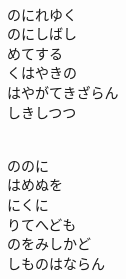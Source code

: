\documentclass[10pt,b5j]{tarticle} %
\begin{document}
\vspace{1.5em} %
\newcommand{\linespace}{0.5em} %
\newcommand{\blocksize}{0.5\hsize} %
\newcommand{\itemmargin}{3em} %
\begin{enumerate} %
    \setlength{\itemindent}{\itemmargin} %
    \begin{minipage}[c]{\blocksize}
    
        \vspace{\linespace}
        \item~\\
        のにれゆく\\
        のにしばし\\
        めてする\\
        くはやきの\\
        はやがてきざらん\\
        しきしつつ
        
    \end{minipage}
    \begin{minipage}[c]{\blocksize}
        
        \vspace{\linespace}
        \item~\\
        ののに\\
        はめぬを\\
        にくに\\
        りてへども\\
        のをみしかど\\
        しものはならん
        
    \end{minipage}
    \begin{minipage}[c]{\blocksize}
        

\end{minipage}
\end{enumerate}
\end{document}
